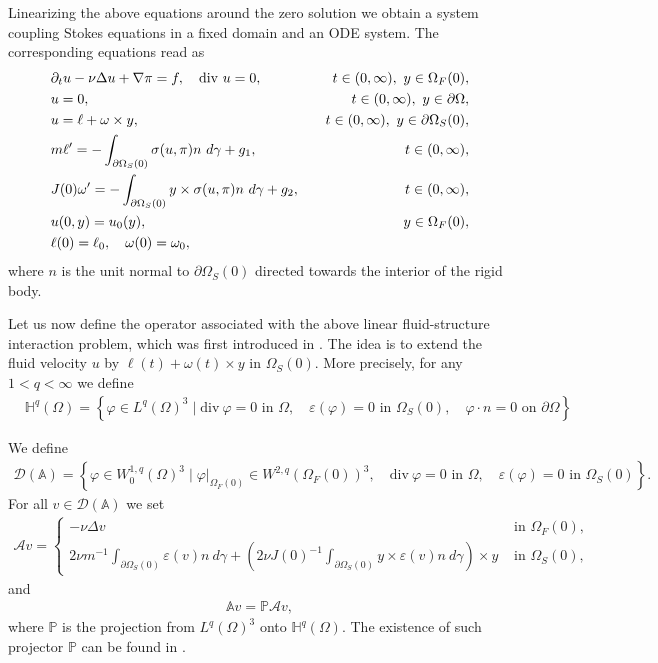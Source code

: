 \documentclass[12pt,a4paper,reqno]{amsart}
\theoremstyle{definition}
\theoremstyle{remark}
\numberwithin{equation}{section}
\newcommand{\oso}{\Omega_{S}(0)}
\newcommand{\ofo}{\Omega_{F}(0)}
\newcommand{\ds}{\displaystyle}
\newcommand{\poso}{\partial\oso}
\begin{document}
Linearizing the above equations around the zero solution we obtain a system coupling Stokes equations in a fixed domain and an  ODE system. The corresponding equations read as
\begin{alignat}{2} \label{fsi-l}
&\partial_{t} u - \nu \Delta u + \nabla \pi  = f, \quad \mathrm{div} \ u = 0, & \quad t \in (0,\infty), \  y\in \ofo, \notag \\
& u = 0,  & t \in (0,\infty), \  y\in \partial\Omega,\notag  \\
&  u  = \ell  + \omega \times y, & \quad t \in (0,\infty), \  y\in \partial\oso, \notag \\
&  m \ell' =  -  \int_{\partial \Omega_{S}(0)}  \sigma(u,\pi) n \ d\gamma  +  g_{1}, & \quad t \in (0,\infty), \\
&  J(0) \omega' =  - \int_{\partial \Omega_{S}(0)} y \times   \sigma(u,\pi)n \ d\gamma + g_{2}, &  \quad t \in (0,\infty), \notag \\
&  u (0,y) = u_{0}(y), &  y \in  \Omega_{F}(0),  \notag \\
&  \ell(0) = \ell_{0}, \quad  \omega(0) = \omega_{0},  \notag
\end{alignat}
where $n$ is the unit normal to $\poso$ directed towards the interior of the rigid body.

Let us now define  the operator associated with the above linear fluid-structure interaction problem, which was first introduced in \cite{TT1,TT2}. The idea is to extend the fluid velocity $u$ by $\ell(t) + \omega(t) \times y$ in $\Omega_{S}(0).$ More precisely,  for any $1 <  q < \infty$  we define
\begin{align}
& \mathbb{H}^{q}(\Omega) = \left\{ \varphi \in L^{q}(\Omega)^{3} \mid \mathrm{div} \ \varphi = 0 \mbox{ in } \Omega, \quad \varepsilon(\varphi) = 0 \mbox{ in } \oso, \quad \varphi \cdot n = 0 \mbox{ on } \partial\Omega \right\}
\end{align}


We define
\begin{align}
\mathcal{D}(\mathbb{A}) = \left\{ \varphi \in W^{1,q}_{0}(\Omega)^{3} \mid \varphi|_{\ofo} \in W^{2,q}(\ofo)^{3}, \quad \mathrm{div} \ \varphi = 0 \mbox{ in } \Omega, \quad \varepsilon(\varphi) = 0 \mbox{ in } \oso\right\}.
\end{align}
For all $v \in \mathcal{D}(\mathbb{A})$ we set
\begin{align*}
\mathcal{A}v = \begin{cases}
- \nu \Delta v & \mbox{ in } \ofo, \\
\ds  2\nu m^{-1} \int_{\poso} \varepsilon(v) n \ d \gamma  + \left(2\nu J(0)^{-1} \int_{\poso} y \times \varepsilon(v)n \ d\gamma \right) \times y & \mbox{ in } \oso,
\end{cases}
\end{align*}
and
\begin{align} \label{sg-TT}
\mathbb{A}v = \mathbb{P} \mathcal{A} v,
\end{align}
where $\mathbb{P}$ is the  projection from $L^{q}(\Omega)^{3}$ onto $\mathbb{H}^{q}(\Omega).$ The existence of such projector $\mathbb{P}$ can be found in \cite[Theorem 2.2]{WX11}.
\end{document}
